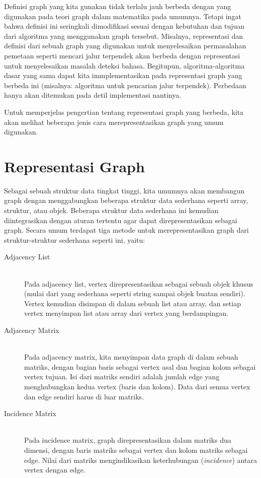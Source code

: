 Definisi graph yang kita gunakan tidak terlalu jauh berbeda dengan yang digunakan pada teori graph dalam matematika pada umumnya. Tetapi ingat bahwa definisi ini seringkali dimodifikasi sesuai dengan kebutuhan dan tujuan dari algoritma yang menggunakan graph tersebut. Misalnya, representasi dan definisi dari sebuah graph yang digunakan untuk menyelesaikan permasalahan pemetaan seperti mencari jalur terpendek akan berbeda dengan representasi untuk menyelesaikan masalah deteksi bahasa. Begitupun, algoritma-algoritma dasar yang sama dapat kita immplementasikan pada representasi graph yang berbeda ini (misalnya: algoritma untuk pencarian jalur terpendek). Perbedaan hanya akan ditemukan pada detil implementasi nantinya.

Untuk memperjelas pengertian tentang representasi graph yang berbeda, kita akan melihat beberapa jenis cara merepresentasikan graph yang umum digunakan.

\section{Representasi Graph}

Sebagai sebuah struktur data tingkat tinggi, kita umumnya akan membangun graph dengan menggabungkan beberapa struktur data sederhana seperti array, struktur, atau objek. Beberapa struktur data sederhana ini kemudian diintegrasikan dengan aturan tertentu agar dapat direpresentasikan sebagai graph. Secara umum terdapat tiga metode untuk merepresentasikan graph dari struktur-struktur sederhana seperti ini, yaitu:

\begin{description}
    \item[Adjacency List] \hfill \\
        Pada adjacency list, vertex direpresentasikan sebagai sebuah objek khusus (mulai dari yang sederhana seperti string sampai objek buatan sendiri). Vertex kemudian disimpan di dalam sebuah list atau array, dan setiap vertex menyimpan list atau array dari vertex yang berdampingan.
    \item[Adjacency Matrix] \hfill \\
        Pada adjacency matrix, kita menyimpan data graph di dalam sebuah matriks, dengan bagian baris sebagai vertex asal dan bagian kolom sebagai vertex tujuan. Isi dari matriks sendiri adalah jumlah edge yang menghubungkan kedua vertex (baris dan kolom). Data dari semua vertex dan edge sendiri harus di luar matriks.
    \item[Incidence Matrix] \hfill \\
        Pada incidence matrix, graph direpresentasikan dalam matriks dua dimensi, dengan baris matriks sebagai vertex dan kolom matriks sebagai edge. Nilai dari matriks mengindikasikan keterhubungan (\textit{incidence}) antara vertex dengan edge.
\end{description}

